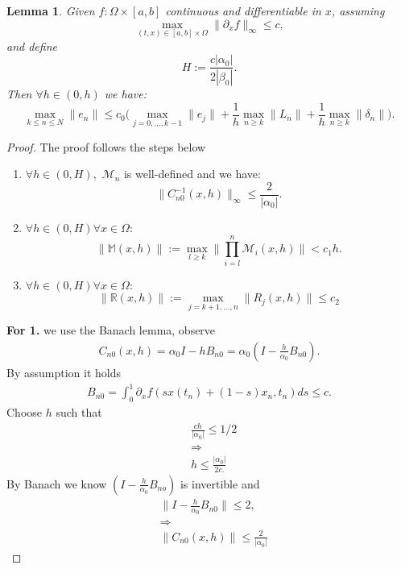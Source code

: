 \documentclass[a4paper,12pt,oneside,fleqn]{book}
\newtheorem{lemma}[theorem]{Lemma}
\theoremstyle{definition}
\theoremstyle{remark}
\begin{document}
\begin{lemma}
Given $f: \Omega \times [a, b]$ continuous and differentiable in  $x$, assuming
\begin{equation*}
	\max_{(t, x) \in [a, b]\times \Omega} \|\partial_x f\|_\infty \le c,
\end{equation*}
and define
\begin{equation}
	H:= \frac{c|\alpha_0|}{2|\beta_0|} .
\end{equation}
Then $\forall h \in (0, h)$ we have:
\begin{equation}
	\max_{k \le n \le N} \|e_n\|  \le c_0 \bigg( \max_{j = 0,\dots, k - 1} \|e_j\| + \frac{1}{h} \max_{n \ge k} \|L_n\| + \frac{1}{h} \max_{n \ge k} \|\delta_n\| \bigg). 
\end{equation}
\end{lemma}
\begin{proof}
The proof follows the steps below
\begin{enumerate}
	\item $\forall h \in (0, H),$ $\mathcal{M}_n$ is well-defined and we have:
	\begin{equation}
		\|C_{n0}^{-1}(x, h)\|_\infty \le \frac{2}{|\alpha_0|}.
	\end{equation}
	\item $\forall h \in (0, H) \forall x \in \Omega $:
	\begin{equation}
		\|\mathbb{M}(x, h) \|:= \max_{l \ge k}\|\prod_{i = l}^n \mathcal{M}_i(x, h)\| < c_1 h. 
	\end{equation}
	\item $\forall h \in (0, H) \forall x \in \Omega$:
	\begin{equation}
		\|\mathbb{R}(x, h)\| := \max_{j = k+1, \dots, n}\|R_j(x, h)\| \le c_2
	\end{equation}
\end{enumerate}
\textbf{For 1.} we use the Banach lemma, observe
\begin{align*}
	C_{n0}(x, h) = \alpha_0 I - hB_{n0} = \alpha_0(I - \frac{h}{\alpha_0}B_{n0}).
\end{align*}
By assumption it holds
\begin{align*}
	B_{n0} = \int_0^1 \partial_x f(sx(t_n) + (1-s)x_n, t_n)ds \le c. 
\end{align*}
Choose $h$ such that
\begin{align*}
	&\frac{ch}{|\alpha_0|} \le 1 \slash 2 \\
	&\Rightarrow\\
	&h \le \frac{|\alpha_0|}{2c.}
\end{align*}
By Banach we know $(I - \frac{h}{\alpha_0}B_{no})$ is invertible and 
\begin{align*}
	& \|I - \frac{h}{\alpha_0}B_{n0}\| \le 2, \\
	& \Rightarrow\\
	& \|C_{n0}(x, h)\| \le \frac{2}{|\alpha_0|}
\end{align*}


\end{proof}
\end{document}
